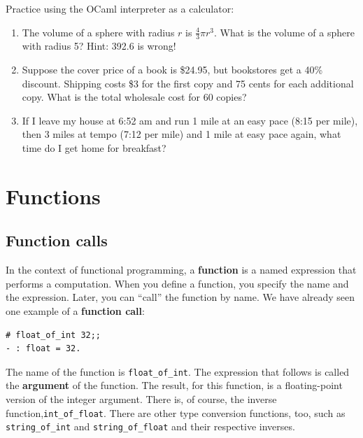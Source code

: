 \documentclass[10pt]{book}
\begin{document}
\begin{ex}
Practice using the OCaml interpreter as a calculator: 

\begin{enumerate}

\item The volume of a sphere with radius $r$ is $\frac{4}{3} \pi r^3$.
  What is the volume of a sphere with radius 5?  Hint: 392.6 is wrong!

\item Suppose the cover price of a book is \$24.95, but bookstores get a
  40\% discount.  Shipping costs \$3 for the first copy and 75 cents
  for each additional copy.  What is the total wholesale cost for
  60 copies?

\item If I leave my house at 6:52 am and run 1 mile at an easy pace
  (8:15 per mile), then 3 miles at tempo (7:12 per mile) and 1 mile at
  easy pace again, what time do I get home for breakfast?


\end{enumerate}
\end{ex}

\chapter{Functions}
\label{funcchap}

\section{Function calls}
\label{functionchap}

In the context of functional programming, a {\bf function} is a named 
expression that performs a computation.  When you define a function,
you specify the name and the expression.  Later, you can ``call'' the 
function by name.  We have already seen one example of a {\bf function 
call}:

\beforeverb
\begin{verbatim}
# float_of_int 32;;
- : float = 32.
\end{verbatim}
\afterverb
%
The name of the function is {\tt \verb"float_of_int"}.  The expression that follows
is called the {\bf argument} of the function.  The result, for this
function, is a floating-point version of the integer argument. There is, of course, the
inverse function,\verb"int_of_float". There are other type conversion functions, too, such as
\verb"string_of_int" and \verb"string_of_float" and their respective inverses.
\end{document}
